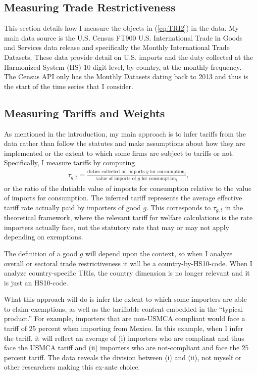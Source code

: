 \documentclass[12pt,pdftex]{article}
\begin{document}
\begin{onehalfspacing}
\section{Measuring Trade Restrictiveness}\label{sec:data}

This section details how I measure the objects in (\ref{eq:TRI2}) in the data. My main data source is the U.S. Census FT900 U.S. International Trade in Goods and Services data release and specifically the Monthly International Trade Datasets. These data provide detail on U.S. imports and the duty collected at the Harmonized System (HS) 10 digit level, by country, at the monthly frequency. The Census API only has the Monthly Datasets dating back to 2013 and thus is the start of the time series that I consider.

\subsection{Measuring Tariffs and Weights}

As mentioned in the introduction, my main approach is to infer tariffs from the data rather than follow the statutes and make assumptions about how they are implemented or the extent to which some firms are subject to tariffs or not. Specifically, I measure tariffs by computing
\begin{align}
\tau_{g,t} = \frac{\mbox{duties collected on imports $g$ for consumption}_{t}}{\mbox{value of imports of $g$ for consumption}_{t}}, \label{eq:realized-tariff}
\end{align}
or the ratio of the dutiable value of imports for consumption relative to the value of imports for consumption. The inferred tariff represents the average effective tariff rate actually paid by importers of good $g$. This corresponds to $\tau_{g,t}$ in the theoretical framework, where the relevant tariff for welfare calculations is the rate importers actually face, not the statutory rate that may or may not apply depending on exemptions.

The definition of a good $g$ will depend upon the context, so when I analyze overall or sectoral trade restrictiveness it will be a country-by-HS10-code. When I analyze country-specific TRIs, the country dimension is no longer relevant and it is just an HS10-code.

What this approach will do is infer the extent to which some importers are able to claim exemptions, as well as the tariffable content embedded in the ``typical product.'' For example, importers that are non-USMCA compliant would face a tariff of 25 percent when importing from Mexico. In this example, when I infer the tariff, it will reflect an average of (i) importers who are compliant and thus face the USMCA tariff and (ii) importers who are not-compliant and face the 25 percent tariff. The data reveals the division between (i) and (ii), not myself or other researchers making this ex-ante choice.


\end{onehalfspacing}
\end{document}
